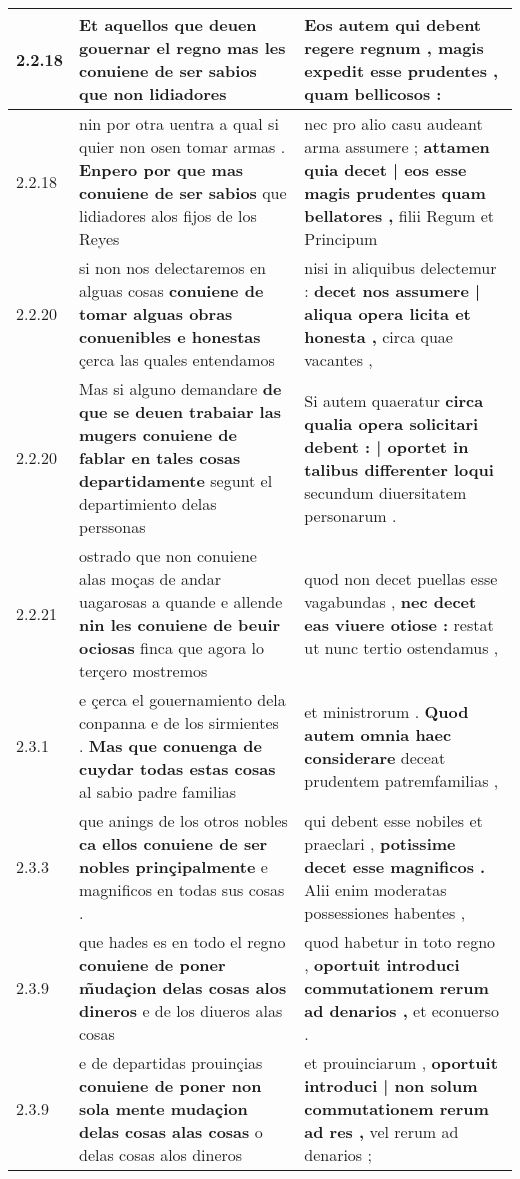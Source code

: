 \begin{tabular}{|p{1cm}|p{6.5cm}|p{6.5cm}|}
2.2.18 & Et aquellos que deuen gouernar el regno \textbf{ mas les conuiene de ser sabios } que non lidiadores & Eos autem qui debent regere regnum , \textbf{ magis expedit esse prudentes , } quam bellicosos : \\\hline
2.2.18 & nin por otra uentra a qual si quier non osen tomar armas . \textbf{ Enpero por que mas conuiene de ser sabios } que lidiadores alos fijos de los Reyes & nec pro alio casu audeant arma assumere ; \textbf{ attamen quia decet | eos esse magis prudentes quam bellatores , } filii Regum et Principum \\\hline
2.2.20 & si non nos delectaremos en alguas cosas \textbf{ conuiene de tomar alguas obras conuenibles e honestas } çerca las quales entendamos & nisi in aliquibus delectemur : \textbf{ decet nos assumere | aliqua opera licita et honesta , } circa quae vacantes , \\\hline
2.2.20 & Mas si alguno demandare \textbf{ de que se deuen trabaiar las mugers conuiene de fablar en tales cosas departidamente } segunt el departimiento delas perssonas & Si autem quaeratur \textbf{ circa qualia opera solicitari debent : | oportet in talibus differenter loqui } secundum diuersitatem personarum . \\\hline
2.2.21 & ostrado que non conuiene alas moças de andar uagarosas a quande e allende \textbf{ nin les conuiene de beuir ociosas } finca que agora lo terçero mostremos & quod non decet puellas esse vagabundas , \textbf{ nec decet eas viuere otiose : } restat ut nunc tertio ostendamus , \\\hline
2.3.1 & e çerca el gouernamiento dela conpanna e de los sirmientes . \textbf{ Mas que conuenga de cuydar todas estas cosas } al sabio padre familias & et ministrorum . \textbf{ Quod autem omnia haec considerare } deceat prudentem patremfamilias , \\\hline
2.3.3 & que anings de los otros nobles \textbf{ ca ellos conuiene de ser nobles prinçipalmente } e magnificos en todas sus cosas . & qui debent esse nobiles et praeclari , \textbf{ potissime decet esse magnificos . } Alii enim moderatas possessiones habentes , \\\hline
2.3.9 & que hades es en todo el regno \textbf{ conuiene de poner m̃udaçion delas cosas alos dineros } e de los diueros alas cosas & quod habetur in toto regno , \textbf{ oportuit introduci commutationem rerum ad denarios , } et econuerso . \\\hline
2.3.9 & e de departidas prouinçias \textbf{ conuiene de poner non sola mente mudaçion delas cosas alas cosas } o delas cosas alos dineros & et prouinciarum , \textbf{ oportuit introduci | non solum commutationem rerum ad res , } vel rerum ad denarios ; \\\hline

\end{tabular}
